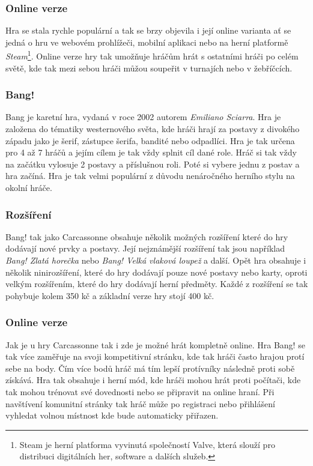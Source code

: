 \subsubsection*{Online verze}
Hra se stala rychle populární a tak se brzy objevila i její online varianta ať se jedná o hru ve webovém prohlížeči, mobilní aplikaci nebo na herní platformě \textit{Steam}\footnote{Steam je herní platforma vyvinutá společností Valve, která slouží pro distribuci digitálních her, software a dalších služeb.}. Online verze hry tak umožňuje hráčům hrát s ostatními hráči po celém světě, kde tak mezi sebou hráči můžou soupeřit v turnajích nebo v žebříčcích.

\subsubsection{Bang!}
\label{subsubsec:popular-board-games-analysis-bang}
Bang je karetní hra, vydaná v roce 2002 autorem \textit{Emiliano Sciarra}. Hra je založena do tématiky westernového světa, kde hráči hrají za postavy z divokého západu jako je šerif, zástupce šerifa, bandité nebo odpadlíci. Hra je tak určena pro 4 až 7 hráčů a jejím cílem je tak vždy splnit cíl dané role. Hráč si tak vždy na začátku vylosuje 2 postavy a příslušnou roli. Poté si vybere jednu z postav a hra začíná. Hra je tak velmi populární z důvodu nenáročného herního stylu na okolní hráče.

\subsubsection*{Rozšíření}
\label{subsubsec:popular-board-games-analysis-bang-expansions}
Bang! tak jako Carcassonne obsahuje několik možných rozšíření které do hry dodávají nové prvky a postavy. Její nejznámější rozšíření tak jsou například \textit{Bang! Zlatá horečka} nebo \textit{Bang! Velká vlaková loupež} a další. Opět hra obsahuje i několik ninirozšíření, které do hry dodávají pouze nové postavy nebo karty, oproti velkým rozšířením, které do hry dodávají herní předměty. Každé z rozšíření se tak pohybuje kolem 350 kč a základní verze hry stojí 400 kč.

\subsubsection*{Online verze}
Jak je u hry Carcassonne tak i zde je možné hrát kompletně online. Hra Bang! se tak více zaměřuje na svoji kompetitivní stránku, kde tak hráči často hrajou protí sebe na body. Čím více bodů hráč má tím lepší protívníky následně proti sobě získává. Hra tak obsahuje i herní mód, kde hráči mohou hrát proti počítači, kde tak mohou trénovat své dovednosti nebo se připravit na online hraní. Při navštívení komunitní stránky tak hráč může po registraci nebo přihlášení vyhledat volnou místnost kde bude automaticky přiřazen.

